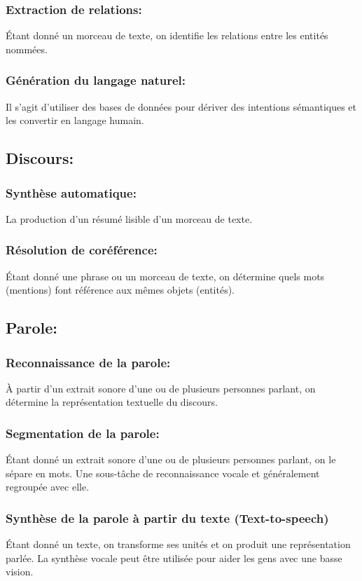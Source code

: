 \subsubsection{Extraction de relations:}
Étant donné un morceau de texte, on identifie les relations entre les entités nommées.
\subsubsection{Génération du langage naturel:}
Il s'agit d'utiliser des bases de données pour dériver des intentions sémantiques et les convertir en langage humain.
\subsection{Discours:}
\subsubsection{Synthèse automatique:}
La production d'un résumé lisible d'un morceau de texte.
\subsubsection{Résolution de coréférence:}
Étant donné une phrase ou un morceau de texte, on détermine quels mots (mentions) font référence aux mêmes objets (entités).
\subsection{Parole:}
\subsubsection{Reconnaissance de la parole:}
À partir d'un extrait sonore d'une ou de plusieurs personnes parlant, on détermine la représentation textuelle du discours.
\subsubsection{Segmentation de la parole:}
Étant donné un extrait sonore d'une ou de plusieurs personnes parlant, on le sépare en mots. Une sous-tâche de reconnaissance vocale et généralement regroupée avec elle.
\subsubsection{Synthèse de la parole à partir du texte (Text-to-speech)}
Étant donné un texte, on transforme ses unités et on produit une représentation parlée. La synthèse vocale peut être utilisée pour aider les gens avec une basse vision. \cite{yi2011assistive}


